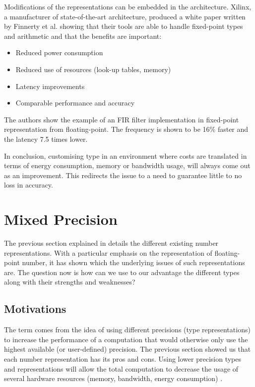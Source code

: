 Modifications of the representations can be embedded in the architecture. Xilinx, a manufacturer of state-of-the-art architecture, produced a white paper written by Finnerty et al. \cite{Xilinx2017} showing that their tools are able to handle fixed-point types and arithmetic and that the benefits are important:
\begin{itemize}
  \item Reduced power consumption
  \item Reduced use of resources (look-up tables, memory)
  \item Latency improvements
  \item Comparable performance and accuracy
\end{itemize}
The authors show the example of an FIR filter implementation in fixed-point representation from floating-point. The frequency is shown to be 16\% faster and the latency 7.5 times lower.

In conclusion, customising type in an environment where costs are translated in terms of energy consumption, memory or bandwidth usage, will always come out as an improvement. This redirects the issue to a need to guarantee little to no loss in accuracy.


\section{Mixed Precision}

The previous section explained in details the different existing number representations. With a particular emphasis on the representation of floating-point number, it has shown which the underlying issues of such representations are. The question now is how can we use to our advantage the different types along with their strengths and weaknesses?

\subsection{Motivations}

The term  comes from the idea of using different precisions (type representations) to increase the performance of a computation that would otherwise only use the highest available (or user-defined) precision. The previous section showed us that each number representation has its pros and cons. Using lower precision types and representations will allow the total computation to decrease the usage of several hardware resources (memory, bandwidth, energy consumption) \cite{Horowitz2014,Nips2015}.

